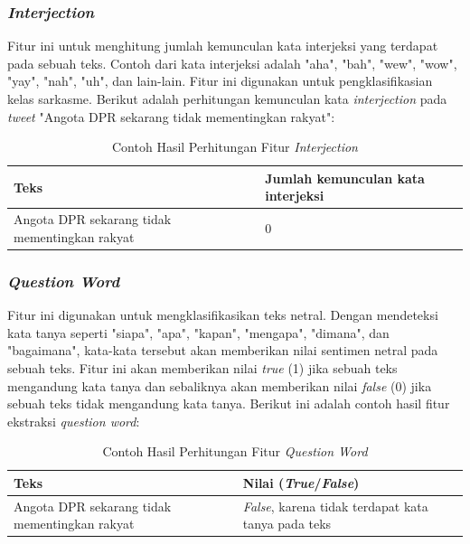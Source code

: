 \subsubsection{\textit{Interjection}}
Fitur ini untuk menghitung jumlah kemunculan kata interjeksi yang terdapat pada sebuah teks. Contoh dari kata interjeksi adalah "aha", "bah", "wew", "wow", "yay", "nah", "uh", dan lain-lain. Fitur ini digunakan untuk pengklasifikasian kelas sarkasme. Berikut adalah perhitungan kemunculan kata \textit{interjection} pada \textit{tweet
} "Angota DPR sekarang tidak mementingkan rakyat":

\begin{table}[H]
	\caption{Contoh Hasil Perhitungan Fitur \textit{Interjection}}
	\centering
	\small
	\begin{adjustbox}{width=1\textwidth}
	\begin{tabular}{|p{7cm}|p{6cm}|}
		\hline
		\textbf{Teks} & \textbf{Jumlah kemunculan kata interjeksi} \\
		\hline
		Angota DPR sekarang tidak mementingkan rakyat & 0 \\
		\hline
	\end{tabular}
	\end{adjustbox}
\end{table}

\subsubsection{\textit{Question Word}}
Fitur ini digunakan untuk mengklasifikasikan teks netral. Dengan mendeteksi kata tanya seperti "siapa", "apa", "kapan", "mengapa", "dimana", dan "bagaimana", kata-kata tersebut akan memberikan nilai sentimen netral pada sebuah teks. Fitur ini akan 
memberikan nilai \textit{true} (1) jika sebuah teks mengandung kata tanya dan sebaliknya akan memberikan nilai \textit{false} (0) jika sebuah teks tidak mengandung kata tanya. Berikut ini adalah contoh hasil fitur ekstraksi \textit{question word}:
\begin{table}[H]
	\caption{Contoh Hasil Perhitungan Fitur \textit{Question Word}}
	\centering
	\small
	\begin{adjustbox}{width=1\textwidth}
	\begin{tabular}{|p{7cm}|p{6cm}|}
		\hline
		\textbf{Teks} & \textbf{Nilai (\textit{True}/\textit{False})} \\
		\hline
		Angota DPR sekarang tidak mementingkan rakyat & \textit{False}, karena tidak 
		terdapat kata tanya pada teks \\
		\hline
	\end{tabular}
	\end{adjustbox}
\end{table}

